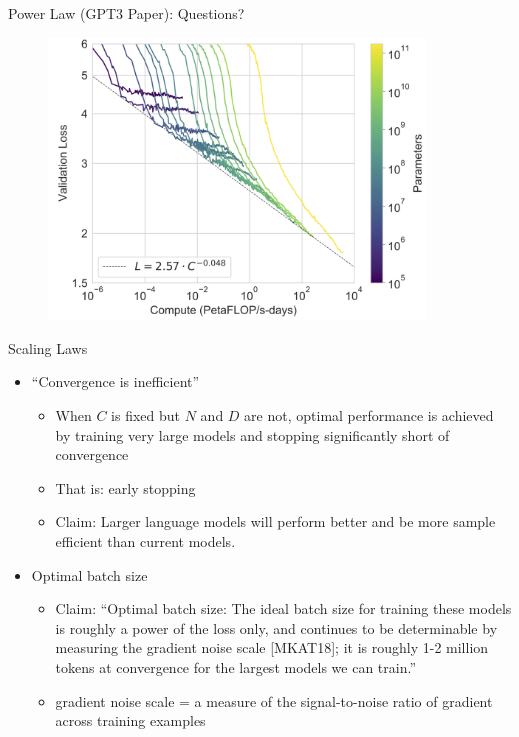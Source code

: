\begin{vbframe}{Power Law (GPT3 Paper): Questions?}

\begin{figure}
    \centering
    \includegraphics[width=10cm]{figure/losscompute.png}
\end{figure}
    
\end{vbframe}


\begin{vbframe}{Scaling Laws}

\vfill

\begin{itemize}

	\item ``Convergence is inefficient''
	\begin{itemize}
	\item When $C$ is fixed but $N$ and $D$ are not, optimal performance is achieved by training very large models and stopping significantly short of convergence  
        \item That is: early stopping
\item Claim: Larger language models will perform better and be more sample efficient than current models.

	\end{itemize}

	\item Optimal batch size
	\begin{itemize}
    	\item Claim: “Optimal batch size: The ideal batch size for training these
                models is roughly a power of the loss only, and continues to
                be determinable by measuring the gradient noise scale
                [MKAT18]; it is roughly 1-2 million tokens at convergence for
                the largest models we can train.”
    	\item gradient noise scale = a measure of the signal-to-noise ratio
            of gradient across training examples
	\end{itemize}

\end{itemize}

\vfill

\end{vbframe}

